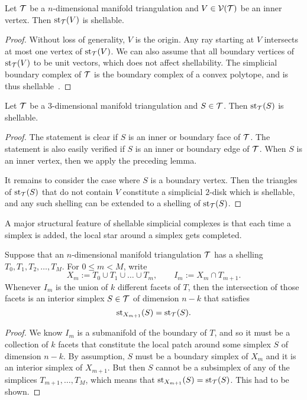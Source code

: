 \documentclass[10pt,letterpaper]{article}
\begin{document}
\begin{lemma}\label{lemma:stars_are_shellable}
    Let ${\mathcal T}$ be a $n$-dimensional manifold triangulation and $V \in {\mathcal V}({\mathcal T})$ be an inner vertex.
    Then $\operatorname{st}_{{\mathcal T}}(V)$ is shellable. 
\end{lemma}
\begin{proof}
    Without loss of generality, $V$ is the origin. 
    Any ray starting at $V$ intersects at most one vertex of $\operatorname{st}_{{\mathcal T}}(V)$.
    We can also assume that all boundary vertices of $\operatorname{st}_{{\mathcal T}}(V)$ to be unit vectors,
    which does not affect shellability. 
    The simplicial boundary complex of ${\mathcal T}$ is the boundary complex of a convex polytope,
    and is thus shellable~\cite[Theorem~8.12]{ziegler2012lectures}. 
\end{proof}


\begin{lemma}
    Let ${\mathcal T}$ be a $3$-dimensional manifold triangulation and $S \in {\mathcal T}$.
    Then $\operatorname{st}_{{\mathcal T}}(S)$ is shellable. 
\end{lemma}
\begin{proof}
    The statement is clear if $S$ is an inner or boundary face of ${\mathcal T}$. 
    The statement is also easily verified if $S$ is an inner or boundary edge of ${\mathcal T}$.
    When $S$ is an inner vertex, then we apply the preceding lemma. 
    
    It remains to consider the case where $S$ is a boundary vertex. 
    Then the triangles of $\operatorname{st}_{{\mathcal T}}(S)$ that do not contain $V$ constitute a simplicial $2$-disk 
    which is shellable,
    and any such shelling can be extended to a shelling of $\operatorname{st}_{{\mathcal T}}(S)$.
\end{proof}


A major structural feature of shellable simplicial complexes 
is that each time a simplex is added, the local star around a simplex gets completed. 

\begin{lemma}\label{lemma:existenceofstar}
    Suppose that an $n$-dimensional manifold triangulation ${\mathcal T}$ has a shelling $T_{0}, T_{1}, T_{2}, \dots, T_{M}$.
    For $0 \leq m < M$, write 
    $$
        X_{m} := T_{0} \cup T_{1} \cup \dots \cup T_{m},
        \qquad 
        I_{m} := X_{m} \cap T_{m+1}.
    $$ 
    Whenever $I_{m}$ is the union of $k$ different facets of $T$, 
    then the intersection of those facets is an interior simplex $S \in {\mathcal T}$ of dimension $n-k$ that satisfies 
    $$
        \operatorname{st}_{X_{m+1}}(S) = \operatorname{st}_{{\mathcal T}}(S).
    $$
\end{lemma}
\begin{proof}
    We know $I_{m}$ is a submanifold of the boundary of $T$, and so it must be a collection of $k$ facets
    that constitute the local patch around some simplex $S$ of dimension $n-k$.
    By assumption, $S$ must be a boundary simplex of $X_{m}$ and it is an interior simplex of $X_{m+1}$. 
    But then $S$ cannot be a subsimplex of any of the simplices $T_{m+1}, \dots, T_{M}$,
    which means that $\operatorname{st}_{X_{m+1}}(S) = \operatorname{st}_{{\mathcal T}}(S)$. 
    This had to be shown.
\end{proof}
\end{document}
